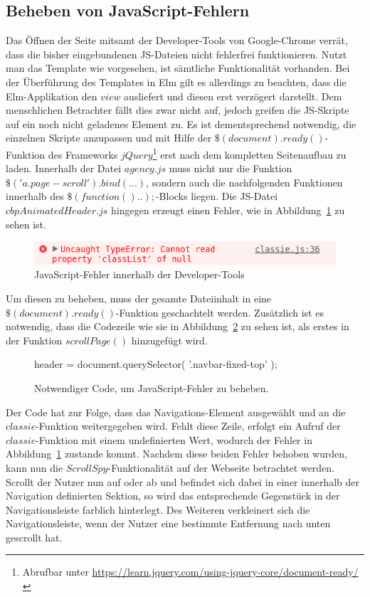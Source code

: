 \subsection{Beheben von JavaScript-Fehlern}
\label{sec:javascript-errors}
Das Öffnen der Seite mitsamt der Developer-Tools von Google-Chrome verrät, dass die bisher eingebundenen \ac{JS}-Dateien nicht fehlerfrei funktionieren. Nutzt man das Template wie vorgesehen, ist sämtliche Funktionalität vorhanden. Bei der Überführung des Templates in Elm gilt es allerdings zu beachten, dass die Elm-Applikation den $view$ ausliefert und diesen erst verzögert darstellt. Dem menschlichen Betrachter fällt dies zwar nicht auf, jedoch greifen die \ac{JS}-Skripte auf ein noch nicht geladenes Element zu. Es ist dementsprechend notwendig, die einzelnen Skripte anzupassen und mit Hilfe der $\$(document).ready()$-Funktion des Frameworks $jQuery$\footnote{Abrufbar unter \url{https://learn.jquery.com/using-jquery-core/document-ready/}} erst nach dem kompletten Seitenaufbau zu laden.
Innerhalb der Datei $agency.js$ muss nicht nur die Funktion $\$('a.page-scroll').bind(...)$, sondern auch die nachfolgenden Funktionen innerhalb des $\$(function(){..});$-Blocks liegen. Die \ac{JS}-Datei $cbpAnimatedHeader.js$ hingegen erzeugt einen Fehler, wie in Abbildung~\ref{fig:js-classie-error} zu sehen ist.
\begin{figure}[h]
\centering
\includegraphics[scale=0.4]{img/error-javascript-classie.png}
\caption{JavaScript-Fehler innerhalb der Developer-Tools}\label{fig:js-classie-error}
\end{figure}
Um diesen zu beheben, muss der gesamte Dateiinhalt in eine $\$(document).ready()$-Funktion geschachtelt werden. Zusätzlich ist es notwendig, dass die Codezeile wie sie in Abbildung~\ref{fig:code-to-add} zu sehen ist, als erstes in der Funktion $scrollPage()$ hinzugefügt wird.
\begin{figure}[h]
\centering
header = document.querySelector( '.navbar-fixed-top' );
\caption{Notwendiger Code, um JavaScript-Fehler zu beheben.}\label{fig:code-to-add}
\end{figure}
Der Code hat zur Folge, dass das Navigations-Element ausgewählt und an die $classie$-Funktion weitergegeben wird. Fehlt diese Zeile, erfolgt ein Aufruf der $classie$-Funktion mit einem undefinierten Wert, wodurch der Fehler in Abbildung~\ref{fig:js-classie-error} zustande kommt. Nachdem diese beiden Fehler behoben wurden, kann nun die $ScrollSpy$-Funktionalität auf der Webseite betrachtet werden. Scrollt der Nutzer nun auf oder ab und befindet sich dabei in einer innerhalb der Navigation definierten Sektion, so wird das entsprechende Gegenstück in der Navigationsleiste farblich hinterlegt. Des Weiteren verkleinert sich die Navigationsleiste, wenn der Nutzer eine bestimmte Entfernung nach unten gescrollt hat.


